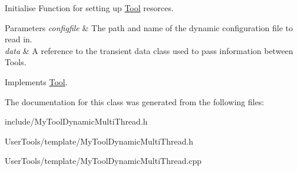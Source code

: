 Initialise Function for setting up \hyperlink{classTool}{Tool} resorces. 


\begin{DoxyParams}{Parameters}
{\em configfile} & The path and name of the dynamic configuration file to read in. \\
\hline
{\em data} & A reference to the transient data class used to pass information between Tools. \\
\hline
\end{DoxyParams}


Implements \hyperlink{classTool_a4b04a99172dfe09dc97927d1feaff0ce}{Tool}.



The documentation for this class was generated from the following files\-:\begin{DoxyCompactItemize}
\item 
include/My\-Tool\-Dynamic\-Multi\-Thread.\-h\item 
User\-Tools/template/My\-Tool\-Dynamic\-Multi\-Thread.\-h\item 
User\-Tools/template/My\-Tool\-Dynamic\-Multi\-Thread.\-cpp\end{DoxyCompactItemize}
